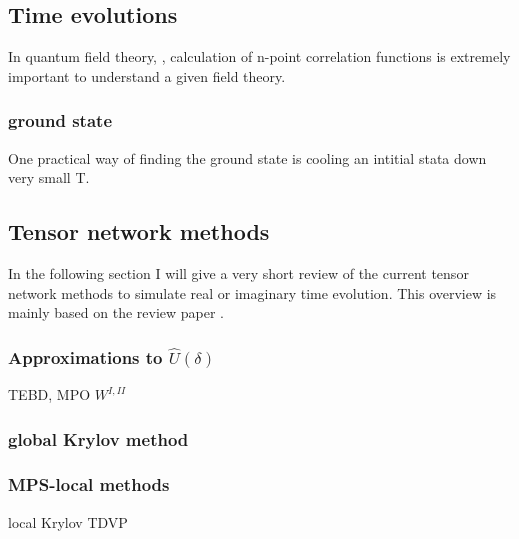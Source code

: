 \subsection{Time evolutions}
In quantum field theory, , calculation of n-point correlation functions is extremely important to understand a given field theory.

\subsubsection{ground state}
One practical way of finding the ground state is cooling an intitial stata down very small T.

\subsection{Tensor network methods}
In the following section I will give a very short review of the current tensor network methods to simulate real or imaginary time evolution. This overview is mainly based on the review paper \cite{Paeckel2019}.

\cite{Paeckel2019}


\subsubsection{Approximations to  \texorpdfstring{$ \hat{U}(\delta)$}{U}   }

TEBD, MPO $W^{I,II}$

\subsubsection{global Krylov method }

\subsubsection{MPS-local methods }
local Krylov
TDVP

